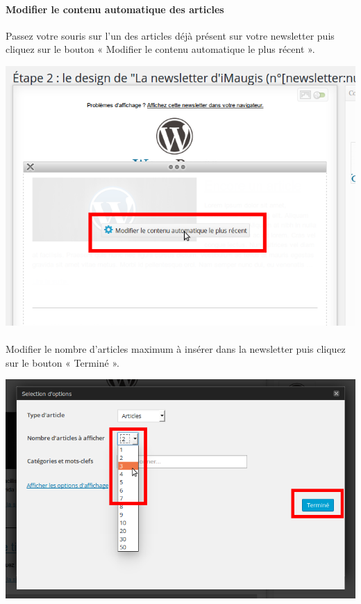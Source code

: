 \documentclass[10pt,a4paper]{article}
\begin{document}
\paragraph{Modifier le contenu automatique des articles} Passez votre souris sur l'un des articles déjà présent sur votre newsletter puis cliquez sur le bouton « Modifier le contenu automatique le plus récent ».
\begin{center}
\includegraphics[scale=0.3]{img/0226.png}
\end{center}
\paragraph{}Modifier le nombre d'articles maximum à insérer dans la newsletter puis cliquez sur le bouton « Terminé ».
\begin{center}
\includegraphics[scale=0.3]{img/0227.png}
\end{center}
\end{document}
